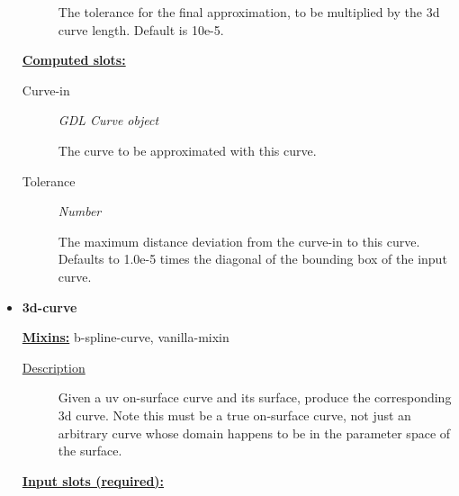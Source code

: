 \documentclass [11pt]{book}
\begin{document}
\begin{itemize}
\begin{description}
 The tolerance for the final approximation, to be
multiplied by the 3d curve length. Default is 10e-5.




\end{description}






\textbf{
\underline{Computed slots:}}

\begin{description}

\item [Curve-in]
\emph{GDL Curve object}

 The curve to be approximated with this curve.




\item [Tolerance]
\emph{Number}

 The maximum distance deviation from the curve-in to this curve.
Defaults to 1.0e-5 times the diagonal of the bounding box of the input curve.




\end{description}







\item {}
\label{prim:3d-curve}
\textbf{3d-curve}


\textbf{
\underline{Mixins:}} b-spline-curve, vanilla-mixin





\begin{description}

\item [
\underline{Description}]


Given a uv on-surface curve and its
surface, produce the corresponding 3d curve.  Note this must be a true
on-surface curve, not just an arbitrary curve whose domain happens to
be in the parameter space of the surface.



\end{description}








\textbf{
\underline{Input slots (required):}}

\begin{description}


\end{description}
\end{itemize}
\end{document}
